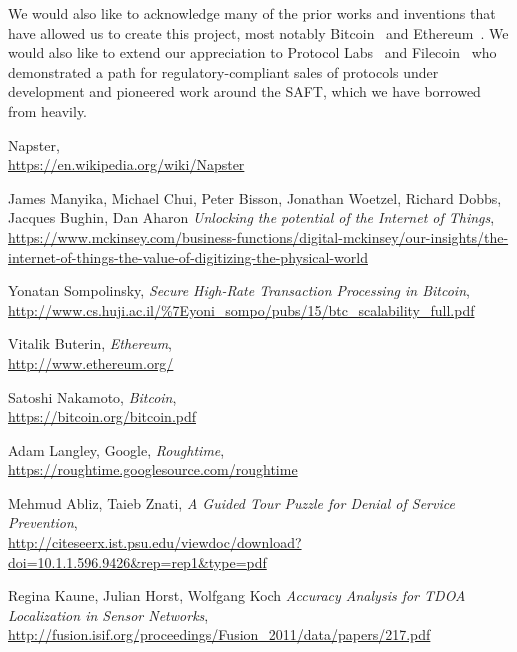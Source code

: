 \documentclass[letterpaper,11pt]{article}
\begin{document}
We would also like to acknowledge many of the prior works and inventions that have allowed us to create this project, most notably Bitcoin~\cite{bitcoin} and Ethereum~\cite{ethereum}. We would also like to extend our appreciation to Protocol Labs~\cite{protocol} and Filecoin~\cite{filecoin} who demonstrated a path for regulatory-compliant sales of protocols under development and pioneered work around the SAFT, which we have borrowed from heavily.
\newpage

\begin{thebibliography}{9}

    Napster, \\
        \url{https://en.wikipedia.org/wiki/Napster}

    James Manyika, Michael Chui, Peter Bisson, Jonathan Woetzel, Richard Dobbs, Jacques Bughin, Dan Aharon
        \emph{Unlocking the potential of the Internet of Things}, \\
        \url{https://www.mckinsey.com/business-functions/digital-mckinsey/our-insights/the-internet-of-things-the-value-of-digitizing-the-physical-world}

    Yonatan Sompolinsky,
        \emph{Secure High-Rate Transaction Processing in Bitcoin}, \\
        \url{http://www.cs.huji.ac.il/\%7Eyoni\_sompo/pubs/15/btc\_scalability\_full.pdf}

    Vitalik Buterin,
        \emph{Ethereum},\\
        \url{http://www.ethereum.org/}

    Satoshi Nakamoto,
        \emph{Bitcoin}, \\
        \url{https://bitcoin.org/bitcoin.pdf}

    Adam Langley, Google,
        \emph{Roughtime}, \\
        \url{https://roughtime.googlesource.com/roughtime}

    Mehmud Abliz, Taieb Znati,
        \emph{A Guided Tour Puzzle for Denial of Service Prevention}, \\
        \url{http://citeseerx.ist.psu.edu/viewdoc/download?doi=10.1.1.596.9426&rep=rep1&type=pdf}

    Regina Kaune, Julian Horst, Wolfgang Koch
        \emph{Accuracy Analysis for TDOA Localization in Sensor Networks}, \\
        \url{http://fusion.isif.org/proceedings/Fusion_2011/data/papers/217.pdf}


\end{thebibliography}
\end{document}
